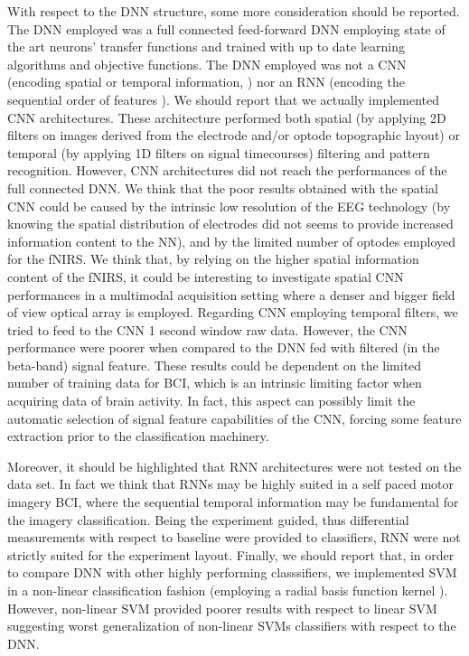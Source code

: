 \documentclass[12pt ]{iopart}
\begin{document}
With respect to the DNN structure, some more consideration should be reported.
The DNN employed was a full connected feed-forward DNN employing state of the art neurons' transfer functions and trained with up to date learning algorithms and objective functions.  The DNN employed was not a CNN (encoding spatial or temporal information, \parencite{krizhevsky2012imagenet,kalchbrenner2014convolutional}) nor an RNN (encoding the sequential order of features \parencite{mikolov2010recurrent,hochreiter1997long}).
We should report that we actually implemented CNN architectures. These architecture performed both spatial  (by applying 2D filters on images derived from the electrode and/or optode topographic layout) or temporal (by applying 1D filters on signal timecourses) filtering and pattern recognition. However, CNN architectures did not reach the performances of the full connected DNN. We think that the poor results obtained with the spatial CNN could be caused by the intrinsic low resolution of the EEG technology \parencite{pfurtscheller1997motor} (by knowing the spatial distribution of electrodes did not seems to provide increased information content to the NN), and by the limited number of optodes employed for the fNIRS. We think that, by relying on the higher spatial information content of the fNIRS, it could be interesting to investigate spatial CNN performances in a multimodal acquisition setting where a denser and bigger field of view optical array is employed. Regarding CNN employing temporal filters, we tried to feed to the CNN  1 second window raw data. However, the CNN performance were poorer when compared to the DNN fed with filtered (in the beta-band) signal feature. These results could be dependent on the limited number of training data for BCI, which is an intrinsic limiting factor when acquiring data of brain activity. In fact, this aspect can possibly limit the automatic selection of signal feature capabilities of the CNN, forcing some feature extraction prior to the classification machinery.

Moreover, it should be  highlighted that RNN architectures were not tested on the data set. In fact we think that RNNs may be highly suited in a self paced motor imagery BCI, where the sequential temporal information may be fundamental for the imagery classification. Being the experiment guided, thus differential measurements with respect to baseline were provided to classifiers, RNN were not strictly suited for the experiment layout. 
Finally, we should report that, in order to compare DNN with other highly performing classsifiers, we implemented SVM in a non-linear classification fashion (employing a radial basis function kernel \parencite{park1991universal}). However, non-linear SVM provided poorer results with respect to linear SVM suggesting worst generalization of non-linear SVMs classifiers with respect to the DNN.
\end{document}
